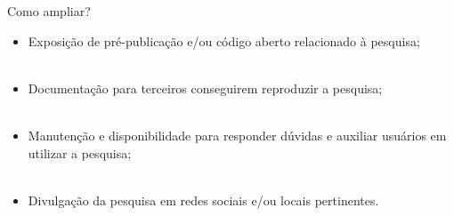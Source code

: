 \begin{frame}{Como ampliar?}
	\justify 
	\begin{itemize}
		\item<1> Exposição de pré-publicação e/ou código aberto relacionado à pesquisa;
		\\~\\
		\item<2> Documentação para terceiros conseguirem reproduzir a pesquisa;
		\\~\\
		\item<3> Manutenção e disponibilidade para responder dúvidas e auxiliar usuários em utilizar a pesquisa;
		\\~\\
		\item<4> Divulgação da pesquisa em redes sociais e/ou locais pertinentes.
	\end{itemize}
\end{frame}